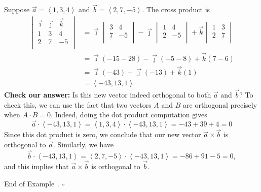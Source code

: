 \documentclass[10pt]{article}
\theoremstyle{definition}
\newtheorem{example}[theorem]{Example}
\renewenvironment{example}
{\begin{oldexample}}
  {\par\smallskip\hfill   End of Example~\theexample. $\square$    \par\end{oldexample}}
\newcommand{\1}[1]{\textbf{1}_{\left[#1\right]}} %
\begin{document}
\begin{example}
  Suppose $\vec{a} = \left\langle 1,3,4 \right\rangle $ and $\vec{b} = \left\langle 2,7,-5 \right\rangle$.
  The cross product is
  \begin{align*} 
    \begin{vmatrix}
      \vec{\imath}&\vec{\jmath}&\vec{k}\\
      1&3&4\\
      2&7&-5\\
    \end{vmatrix}
    &=
    \vec{\imath}
    \begin{vmatrix}
      3&4\\
      7&-5\\
    \end{vmatrix}
    -
    \vec{\jmath}
    \begin{vmatrix}
      1&4\\
      2&-5\\
    \end{vmatrix}
    +
    \vec{k}
    \begin{vmatrix}
      1&3\\
      2&7\\
    \end{vmatrix}\\
    &=\vec{\imath} \left(-15-28  \right) - \vec{\jmath}\left( -5-8 \right) +\vec{k}\left( 7-6 \right)\\
    &=\vec{\imath} \left(-43  \right) - \vec{\jmath}\left( -13 \right) +\vec{k}\left(1 \right)\\
    &=\left\langle -43,13,1 \right\rangle 
  \end{align*}
  \textbf{Check our answer:} Is this new vector indeed orthogonal to both
  $\vec{a}$ and $\vec{b}?$ To check this, we can use the fact that two vectors $A$ and $B$ are orthogonal precisely
  when $A\cdot B=0$. Indeed, doing the dot product computation gives
  \begin{equation*}
    \vec{a} \cdot \left\langle -43,13,1
    \right\rangle= \left\langle 1,3,4  \right\rangle \cdot \left\langle -43,13,1
    \right\rangle= -43+39+4 = 0
  \end{equation*}
  Since this dot product is zero, we conclude that our new vector $\vec{a}\times \vec{b}$ is orthogonal to $\vec{a}$.
  Similarly, we have
  \begin{equation*}
    \vec{b}\cdot \left\langle -43,13,1 \right\rangle= \left\langle 2,7,-5 \right\rangle\cdot \left\langle -43,13,1
    \right\rangle= -86+91-5 =0,
  \end{equation*}
  and this implies that $\vec{a}\times \vec{b}$ is orthogonal to $\vec{b}$.
\end{example}
\end{document}
